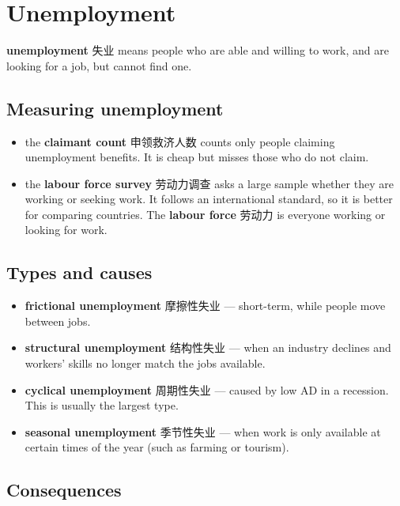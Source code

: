 \documentclass[11pt]{article}
\begin{document}
\section*{Unemployment}

\textbf{unemployment} 失业 means people who are able and willing to work, and are looking for a job, but cannot find one.

\subsection*{Measuring unemployment}

\begin{itemize}
\item the \textbf{claimant count} 申领救济人数 counts only people claiming unemployment benefits. It is cheap but misses those who do not claim.

\item the \textbf{labour force survey} 劳动力调查 asks a large sample whether they are working or seeking work. It follows an international standard, so it is better for comparing countries. The \textbf{labour force} 劳动力 is everyone working or looking for work.

\end{itemize}

\subsection*{Types and causes}

\begin{itemize}
\item \textbf{frictional unemployment} 摩擦性失业 — short-term, while people move between jobs.

\item \textbf{structural unemployment} 结构性失业 — when an industry declines and workers' skills no longer match the jobs available.

\item \textbf{cyclical unemployment} 周期性失业 — caused by low AD in a recession. This is usually the largest type.

\item \textbf{seasonal unemployment} 季节性失业 — when work is only available at certain times of the year (such as farming or tourism).

\end{itemize}

\subsection*{Consequences}
\end{document}
